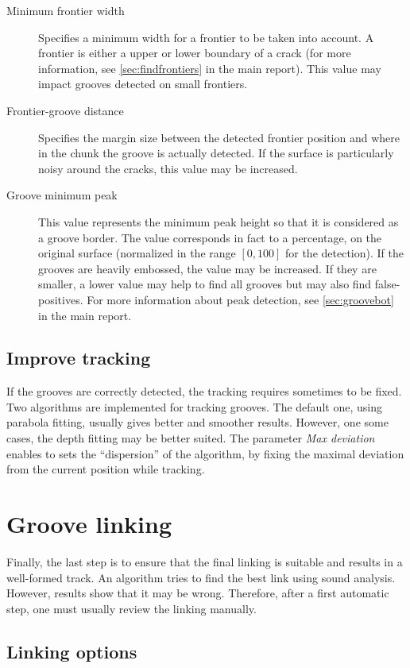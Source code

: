 \begin{description}
\item[Minimum frontier width] Specifies a minimum width for a frontier to be taken into account. A frontier is either a upper or lower boundary of a crack (for more information, see \autoref{sec:findfrontiers} in the main report). This value may impact grooves detected on small frontiers.
\item[Frontier-groove distance] Specifies the margin size between the detected frontier position and where in the chunk the groove is actually detected. If the surface is particularly noisy around the cracks, this value may be increased.
\item[Groove minimum peak] This value represents the minimum peak height so that it is considered as a groove border. The value corresponds in fact to a percentage, on the original surface (normalized in the range $[0,100]$ for the detection). If the grooves are heavily embossed, the value may be increased. If they are smaller, a lower value may help to find all grooves but may also find false-positives. For more information about peak detection, see \autoref{sec:groovebot} in the main report.
\end{description}

\subsection{Improve tracking}

If the grooves are correctly detected, the tracking requires sometimes to be fixed. Two algorithms are implemented for tracking grooves. The default one, using parabola fitting, usually gives better and smoother results. However, one some cases, the depth fitting may be better suited. The parameter \emph{Max deviation} enables to sets the ``dispersion'' of the algorithm, by fixing the maximal deviation from the current position while tracking.

\section{Groove linking}

Finally, the last step is to ensure that the final linking is suitable and results in a well-formed track. An algorithm tries to find the best link using sound analysis. However, results show that it may be wrong. Therefore, after a first automatic step, one must usually review the linking manually.

\subsection{Linking options}

